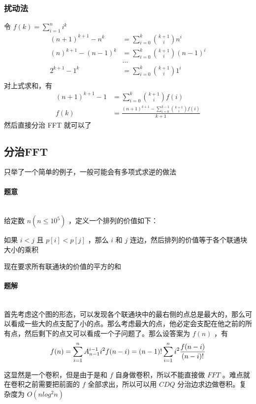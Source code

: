 	\subsubsection{扰动法}
	令 $f(k)=\sum_{i=1}^{n} i^k$
	$$
	\begin{aligned}
	(n+1)^{k+1}-n^k&=\sum_{i=0}^{k}\binom{k+1}{i}n^i\\
	(n)^{k+1}-(n-1)^k&=\sum_{i=0}^{k}\binom{k+1}{i}(n-1)^i\\
	&\ldots\\
	2^{k+1}-1^k&=\sum_{i=0}^{k}\binom{k+1}{i}1^i\\
	\end{aligned}
	$$
	对上式求和，有
	$$
	\begin{aligned}
	(n+1)^{k+1}-1&=\sum_{i=0}^{k}\binom{k+1}{i}f(i)\\
	f(k)&=\frac{(n+1)^{k+1}-\sum_{i=0}^{k-1}\binom{k+1}{i}f(i)}{k+1}
	\end{aligned}
	$$
	然后直接分治 FFT 就可以了 
	\newpage
	\subsection{分治FFT}
	只举了一个简单的例子，一般可能会有多项式求逆的做法
	\paragraph{题意}~\\
	
	给定数 $n(n\le10^5)$ ，定义一个排列的价值如下：
	
	如果 $i<j$ 且 $p[i]<p[j]$ ，那么 $i$ 和 $j$ 连边，然后排列的价值等于各个联通块大小的乘积
	
	现在要求所有联通块的价值的平方的和
	
	\paragraph{题解}~\\
	
	首先考虑这个图的形态，可以发现各个联通块中的最右侧的点总是最大的，那么可以看成一些大的点支配了小的点。那么考虑最大的点，他必定会支配在他之前的所有点，然后剩下的点又可以看成一个子问题了。那么设答案为 $f(n)$ ，有
	$$
	f(n) =\sum_{i=1}^{n}A_{n-1}^{i-1}i^2f(n-i)\\
	=(n-1)!\sum_{i=1}^{n}i^2\frac{f(n-i)}{(n-i)!}
	$$
	
	这显然是一个卷积，但是由于是和 $f$ 自身做卷积，所以不能直接做 $FFT$ 。难点就在卷积之前需要把前面的 $f$ 全部求出，所以可以用 $CDQ$ 分治边求边做卷积。复杂度为 $O(nlog^2n)$
	\vspace{3cm}
	~\\
	
	\newpage

